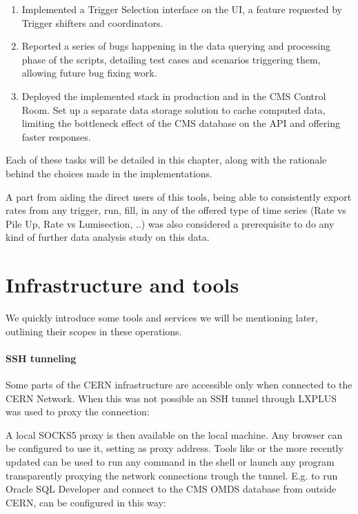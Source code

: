 \begin{enumerate}
        \item Implemented a Trigger Selection interface on the UI, a feature requested by Trigger shifters and coordinators.
        \item Reported a series of bugs happening in the data querying and processing phase of the scripts, detailing test cases and scenarios triggering them, allowing future bug fixing work.
        \item Deployed the implemented stack in production and in the CMS Control Room. Set up a separate data storage solution to cache computed data, limiting the bottleneck effect of the CMS database on the API and offering faster responses.


\end{enumerate}

Each of these tasks will be detailed in this chapter, along with the rationale behind the choices made in the implementations.

A part from aiding the direct users of this tools, being able to consistently export rates from any trigger, run, fill, in any of the offered type of time series (Rate vs Pile Up, Rate vs Lumisection, ..) was also considered a prerequisite to do any kind of further data analysis study on this data.

\section{Infrastructure and tools}

We quickly introduce some tools and services we will be mentioning later, outlining their scopes in these operations.

\paragraph{SSH tunneling}

Some parts of the CERN infrastructure are accessible only when connected to the CERN Network. When this was not possible an SSH tunnel through LXPLUS was used to proxy the connection:


A local SOCKS5 proxy is then available on the local machine. Any browser can be configured to use it, setting  as proxy address. Tools like  \cite{tsocksTransparentSOCKSProxyingLibrary-2020-10-07} or the more recently updated  \cite{proxychains-ng} can be used to run any command in the shell or launch any program transparently proxying the network connections trough the tunnel. E.g. to run Oracle SQL Developer and connect to the CMS OMDS database from outside CERN,  can be configured in this way:

